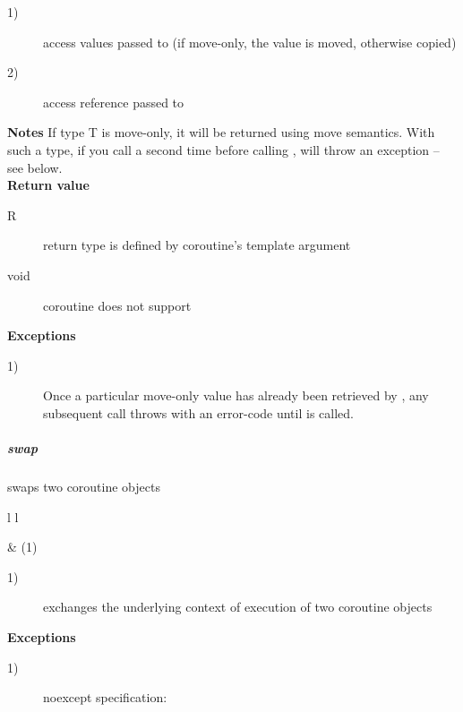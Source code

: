 \begin{description}
    \item[1)] access values passed to \corofunction (if move-only, the
              value is moved, otherwise copied)
    \item[2)] access reference passed to \corofunction\\
\end{description}

{\bf Notes}
\newline
If type T is move-only, it will be returned using move semantics. With
such a type, if you call \get a second time before calling
, \get will throw an exception -- see below.\\

{\bf Return value}
\begin{description}
    \item[R] return type is defined by coroutine's template argument
    \item[void] coroutine does not support \get\\
\end{description}

{\bf Exceptions}
\begin{description}
    \item[1)] Once a particular move-only value has already been
        retrieved by \get, any subsequent \get call throws
         with an error-code
         until  is called.\\
\end{description}

\subparagraph*{swap}
swaps two coroutine objects\\

\begin{tabular}{ l l }
    \midrule

     & (1)\\

    \midrule
\end{tabular}

\begin{description}
    \item[1)] exchanges the underlying context of execution of two coroutine
              objects\\
\end{description}

{\bf Exceptions}
\begin{description}
    \item[1)] noexcept specification: \\
\end{description}

